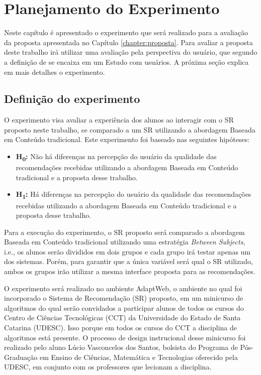 \chapter{Planejamento do Experimento}\label{chapter:experimento}

Neste capítulo é apresentado o experimento que será realizado para a avaliação da proposta apresentada no Capítulo \ref{chapter:proposta}.
Para avaliar a proposta deste trabalho irá utilizar uma avaliação pela perspectiva do usuário, que segundo a definição de
 se encaixa em um Estudo com usuários. A próxima seção explica em mais detalhes o experimento.

\section{Definição do experimento}

O experimento visa avaliar a experiência dos alunos ao interagir com o SR proposto neste trabalho, se comparado a um SR
utilizando a abordagem Baseada em Conteúdo tradicional. Este experimento foi
baseado nas seguintes hipóteses:

\begin{itemize}
\item \textbf{H\textsubscript{0}:} Não há diferenças na percepção do usuário da qualidade das recomendações recebidas utilizando a abordagem
Baseada em Conteúdo tradicional e a proposta desse trabalho.
\item \textbf{H\textsubscript{1}:} Há diferenças na percepção do usuário da qualidade das recomendações recebidas utilizando a abordagem
Baseada em Conteúdo tradicional e a proposta desse trabalho.
\end{itemize}

Para a execução do experimento, o SR proposto será comparado a abordagem Baseada em Conteúdo tradicional utilizando uma
estratégia \textit{Between Subjects}, i.e., os alunos serão divididos em dois grupos e cada grupo irá testar apenas
um dos sistemas. Porém, para garantir que a única variável será qual o SR utilizado, ambos os grupos irão utilizar a mesma
interface proposta para as recomendações.

O experimento será realizado no ambiente AdaptWeb\textsuperscript{\textregistered}, o ambiente no qual foi incorporado o
Sistema de Recomendação (SR) proposto, em um minicurso de algoritmos do qual serão convidados a participar alunos de todos os cursos do Centro de
Ciências Tecnológicas (CCT) da Universidade do Estado de Santa Catarina (UDESC). Isso porque em todos os cursos do CCT
a disciplina de algoritmos está presente. O processo de design instrucional desse minicurso foi realizado pelo aluno
Lúcio Vasconcelos dos Santos, bolsista do Programa de Pós-Graduação em Ensino de Ciências, Matemática e Tecnologias
oferecido pela UDESC, em conjunto com os professores que lecionam a disciplina.

